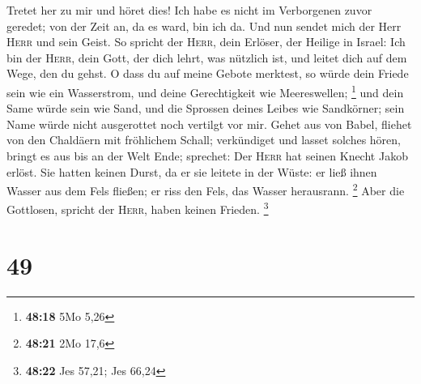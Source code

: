  Tretet her zu mir und höret dies! Ich habe es nicht im
Verborgenen zuvor geredet; von der Zeit an, da es ward, bin ich da. Und
nun sendet mich der Herr \textsc{Herr} und sein Geist. 
So spricht der \textsc{Herr}, dein Erlöser, der Heilige in Israel: Ich
bin der \textsc{Herr}, dein Gott, der dich lehrt, was nützlich ist, und
leitet dich auf dem Wege, den du gehst.  O dass du auf
meine Gebote merktest, so würde dein Friede sein wie ein Wasserstrom,
und deine Gerechtigkeit wie Meereswellen; \footnote{\textbf{48:18} 5Mo
  5,26}  und dein Same würde sein wie Sand, und die
Sprossen deines Leibes wie Sandkörner; sein Name würde nicht ausgerottet
noch vertilgt vor mir.  Gehet aus von Babel, fliehet von
den Chaldäern mit fröhlichem Schall; verkündiget und lasset solches
hören, bringt es aus bis an der Welt Ende; sprechet: Der \textsc{Herr}
hat seinen Knecht Jakob erlöst.  Sie hatten keinen Durst,
da er sie leitete in der Wüste: er ließ ihnen Wasser aus dem Fels
fließen; er riss den Fels, das Wasser herausrann. \footnote{\textbf{48:21}
  2Mo 17,6}  Aber die Gottlosen, spricht der
\textsc{Herr}, haben keinen Frieden. \footnote{\textbf{48:22} Jes 57,21;
  Jes 66,24}

\hypertarget{section-17}{%
\section{49}\label{section-17}}

